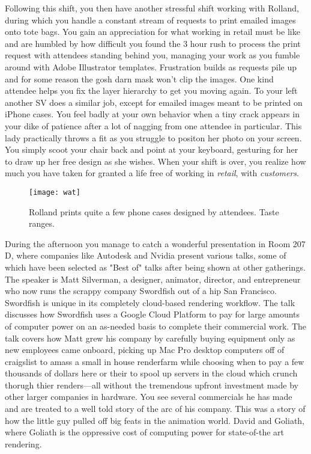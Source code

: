 \documentclass[../main.tex]{subfiles}
\begin{document}
Following this shift, you then have another stressful shift working with Rolland, during which you handle a constant stream of requests to print emailed images onto tote bags. You gain an appreciation for what working in retail must be like and are humbled by how difficult you found the 3 hour rush to process the print request with attendees standing behind you, managing your work as you fumble around with Adobe Illustrator templates. Frustration builds as requests pile up and for some reason the gosh darn mask won't clip the images. One kind attendee helps you fix the layer hierarchy to get you moving again. To your left another SV does a similar job, except for emailed images meant to be printed on iPhone cases. You feel badly at your own behavior when a tiny crack appears in your dike of patience after a lot of nagging from one attendee in particular. This lady practically throws a fit as you struggle to positon her photo on your screen. You simply scoot your chair back and point at your keyboard, gesturing for her to draw up her free design as she wishes. When your shift is over, you realize how much you have taken for granted a life free of working in \textit{retail}, with \textit{customers}.

\begin{figure}[h!]
	\centering
	\texttt{[image: wat]}
	\caption*{Rolland prints quite a few phone cases designed by attendees. Taste ranges.}
\end{figure}

During the afternoon you manage to catch a wonderful presentation in Room 207 D, where companies like Autodesk and Nvidia present various talks, some of which have been selected as "Best of" talks after being shown at other gatherings. The speaker is Matt Silverman, a designer, animator, director, and entrepreneur who now runs the scrappy company Swordfish out of a hip San Francisco. Swordfish is unique in its completely cloud-based rendering workflow. The talk discusses how Swordfish uses a Google Cloud Platform to pay for large amounts of computer power on an as-needed basis to complete their commercial work. The talk covers how Matt grew his company by carefully buying equipment only as new employees came onboard, picking up Mac Pro desktop computers off of craigslist to amass a small in house renderfarm while choosing when to pay a few thousands of dollars here or their to spool up servers in the cloud which crunch thorugh thier renders---all without the tremendous upfront investment made by other larger companies in hardware. You see several commercials he has made and are treated to a well told story of the arc of his company. This was a story of how the little guy pulled off big feats in the animation world. David and Goliath, where Goliath is the oppressive cost of computing power for state-of-the art rendering.
\end{document}
